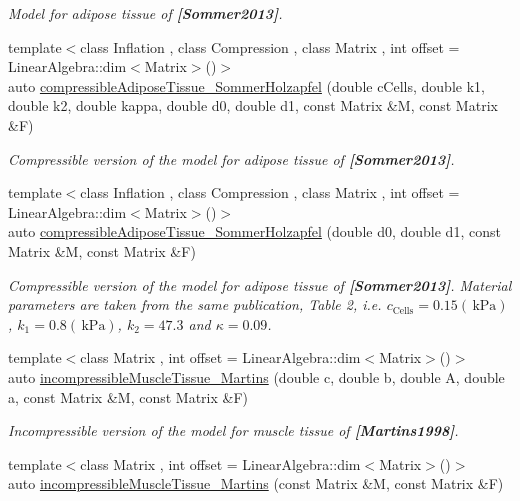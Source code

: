 \begin{DoxyCompactItemize}
\begin{DoxyCompactList}\small\item\em Model for adipose tissue of {\bfseries [Sommer2013]}. \end{DoxyCompactList}\item 
{\footnotesize template$<$class Inflation , class Compression , class Matrix , int offset = Linear\+Algebra\+::dim$<$\+Matrix$>$()$>$ }\\auto \hyperlink{group__Biomechanics_ga5c3388564c0420b62e58f48c739d27f1}{compressible\+Adipose\+Tissue\+\_\+\+Sommer\+Holzapfel} (double c\+Cells, double k1, double k2, double kappa, double d0, double d1, const Matrix \&M, const Matrix \&F)
\begin{DoxyCompactList}\small\item\em Compressible version of the model for adipose tissue of {\bfseries [Sommer2013]}. \end{DoxyCompactList}\item 
{\footnotesize template$<$class Inflation , class Compression , class Matrix , int offset = Linear\+Algebra\+::dim$<$\+Matrix$>$()$>$ }\\auto \hyperlink{group__Biomechanics_ga27bb3f7c579ce8c21a69ea4d4d0169d7}{compressible\+Adipose\+Tissue\+\_\+\+Sommer\+Holzapfel} (double d0, double d1, const Matrix \&M, const Matrix \&F)
\begin{DoxyCompactList}\small\item\em Compressible version of the model for adipose tissue of {\bfseries [Sommer2013]}. Material parameters are taken from the same publication, Table 2, i.\+e. $c_\mathrm{Cells}=0.15 (\,\mathrm{kPa})$, $k_1=0.8 (\,\mathrm{kPa})$, $k_2=47.3$ and $\kappa=0.09$. \end{DoxyCompactList}\item 
{\footnotesize template$<$class Matrix , int offset = Linear\+Algebra\+::dim$<$\+Matrix$>$()$>$ }\\auto \hyperlink{group__Biomechanics_gafcc36a1958899ca9246c4c1b3c9bfd85}{incompressible\+Muscle\+Tissue\+\_\+\+Martins} (double c, double b, double A, double a, const Matrix \&M, const Matrix \&F)
\begin{DoxyCompactList}\small\item\em Incompressible version of the model for muscle tissue of {\bfseries [Martins1998]}. \end{DoxyCompactList}\item 
{\footnotesize template$<$class Matrix , int offset = Linear\+Algebra\+::dim$<$\+Matrix$>$()$>$ }\\auto \hyperlink{group__Biomechanics_ga9e414585a90b1988e9fa88d17d875055}{incompressible\+Muscle\+Tissue\+\_\+\+Martins} (const Matrix \&M, const Matrix \&F)

\end{DoxyCompactItemize}
